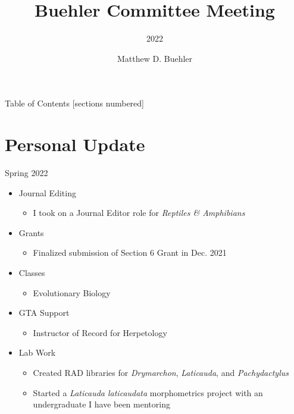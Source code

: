 \documentclass[10pt,aspectratio=169]{beamer}
\title{Buehler Committee Meeting}
\subtitle{2022}
\date{}
\author{Matthew D. Buehler}
\institute{Department of Biological Sciences}
\begin{document}
\maketitle

\begin{frame}{Table of Contents}
  [sections numbered]
  \tableofcontents%
\end{frame}

\section[Personal Update]{Personal Update}

\begin{frame}{Spring 2022}  
\begin{itemize}
  \item Journal Editing
  \begin{itemize}
    \item I took on a Journal Editor role for \textit{Reptiles \& Amphibians}
  \end{itemize}
  \item Grants
  \begin{itemize}
    \item Finalized submission of Section 6 Grant in Dec. 2021
  \end{itemize}
  \item Classes
    \begin{itemize}
      \item Evolutionary Biology
    \end{itemize}
  \item GTA Support
    \begin{itemize}
    \item Instructor of Record for Herpetology
    \end{itemize}
  \item Lab Work
    \begin{itemize}
      \item Created RAD libraries for \textit{Drymarchon}, \textit{Laticauda}, and \textit{Pachydactylus}
      \item Started a \textit{Laticauda laticaudata} morphometrics project with an undergraduate I have been mentoring
    \end{itemize}
\end{itemize}
\end{frame}
\end{document}
